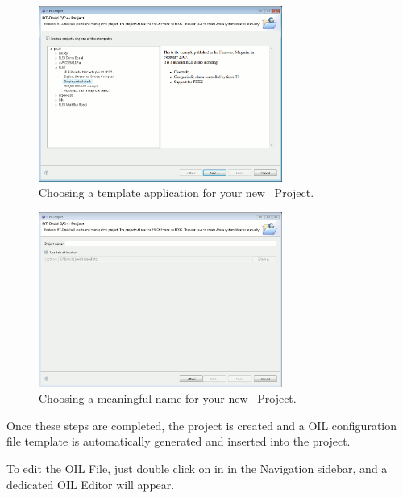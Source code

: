 \begin{figure}
  \begin{center}
    \includegraphics[width=8cm, bb=0 0 943 676]{images/project_template.png}
  \end{center}
  \caption{Choosing a template application for your new \rtd\ Project.}
  \label{fig:rtdruid-project-template}
\end{figure}

\begin{figure}
  \begin{center}
    \includegraphics[width=8cm, bb=0 0 943 676]{images/project_name.png}
  \end{center}
  \caption{Choosing a  meaningful name for your new \rtd\ Project.}
  \label{fig:rtdruid-project-name}
\end{figure}

Once these steps are completed, the project is created and a OIL
configuration file template is automatically generated and inserted
into the project.

To edit the OIL File, just double click on in in the Navigation
sidebar, and a dedicated OIL Editor will appear.






